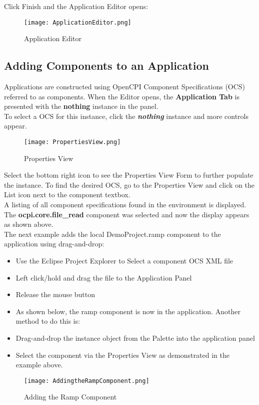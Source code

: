 Click Finish and the Application Editor opens:
\begin{figure}[h!]
	\centering
	\caption{Application Editor}{}
	\texttt{[image: ApplicationEditor.png]}
 \end{figure}

\subsection{Adding Components to an Application}
Applications are constructed using OpenCPI Component Specifications (OCS) referred to as components. When the Editor opens, the \textbf{Application Tab} is presented with the \textbf{nothing} instance in the panel.\\
To select a OCS for this instance, click the \textbf{\emph{nothing}} instance and more controls appear. \\

\begin{figure}[h!]
	\centering
	\caption{Properties View}{}
	\texttt{[image: PropertiesView.png]}
 \end{figure}
\bigskip
Select the bottom right icon to see the Properties View Form to further populate the instance. To find the desired OCS, go to the Properties View and click on the List icon next to the component textbox.\\

A listing of all component specifications found in the environment is displayed. The \textbf{ocpi.core.file\_read} component was selected and now the display appears as shown above.\\

The next example adds the local DemoProject.ramp component to the application using drag-and-drop:
\begin{itemize}
\item	Use the Eclipse Project Explorer to Select a component OCS XML file
\item	Left click/hold and drag the file to the Application Panel
\item	Release the mouse button
\item[] As shown below, the ramp component is now in the application. Another method to do this is:
\item	Drag-and-drop the instance object from the Palette into the application panel
\item	Select the component via the Properties View as demonstrated in the example above.
\end{itemize}
\begin{figure}[h!]
	\centering
	\caption{Adding the Ramp Component}{}
	\texttt{[image: AddingtheRampComponent.png]}
 \end{figure}

